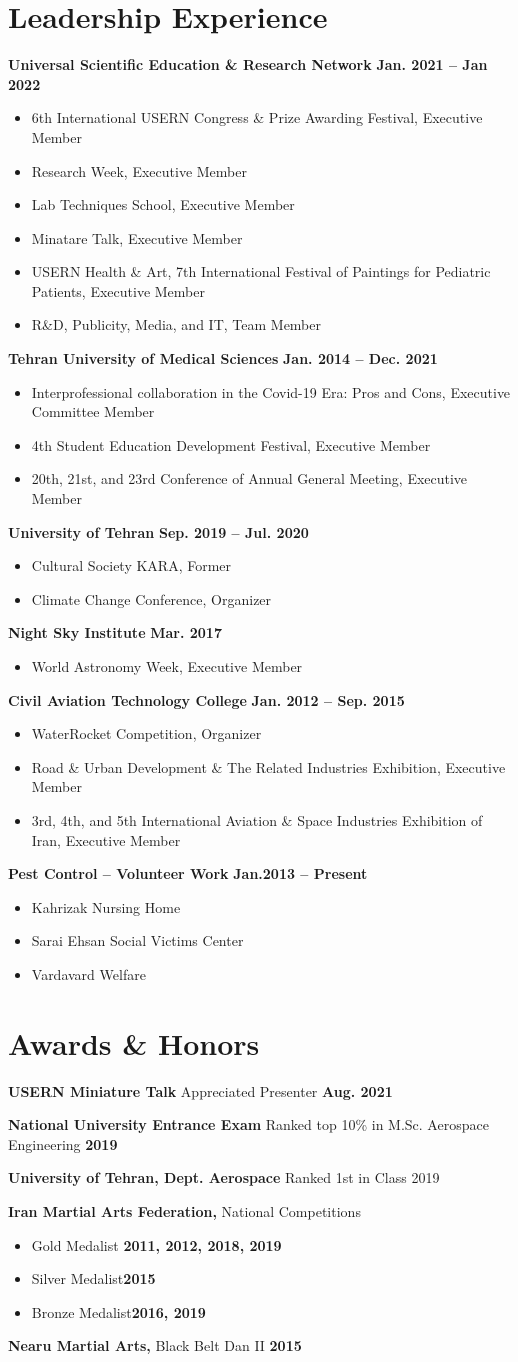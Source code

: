 \documentclass[a4,25pt]{article}
\newenvironment{Experience}[1]{
    \section*{#1} \vspace{-.2cm}
    \hspace{.5cm}
    \begin{minipage}{0.95\linewidth}
    }{ \end{minipage}}
\newcommand{\experience}[3]{ 
  \vspace{0.1cm}\textbf{#1}{ #2} \hfill \textbf{#3} \par
}
\newcommand{\expdetails}[1]{
    \begin{itemize} 
    \item #1 \vspace{1pt}
    \end{itemize} 
}
\begin{document}
\begin{Experience}{Leadership Experience}
    \experience{Universal Scientific Education \& Research Network}{}{Jan. 2021 – Jan 2022}
    \expdetails{6th International USERN Congress \& Prize Awarding Festival, Executive Member} 
    \expdetails{Research Week, Executive Member}
    \expdetails{Lab Techniques School, Executive Member}
    \expdetails{Minatare Talk, Executive Member}
    \expdetails{USERN Health \& Art, 7th International Festival of Paintings for Pediatric Patients, Executive Member}
    \expdetails{R\&D, Publicity, Media, and IT, Team Member}
    \experience{Tehran University of Medical Sciences}{}{Jan. 2014 – Dec. 2021}
    \expdetails{Interprofessional collaboration in the Covid-19 Era: Pros and Cons, Executive Committee Member}
    \expdetails{4th Student Education Development Festival, Executive Member}
    \expdetails{20th, 21st, and 23rd Conference of Annual General Meeting, Executive Member}
    \experience{University of Tehran}{}{Sep. 2019 – Jul. 2020}
    \expdetails{Cultural Society KARA, Former}
    \expdetails{Climate Change Conference, Organizer}
    \experience{Night Sky Institute}{}{Mar. 2017}
    \expdetails{World Astronomy Week, Executive Member}
    \experience{Civil Aviation Technology College}{}{Jan. 2012 – Sep. 2015}
    \expdetails{WaterRocket Competition, Organizer}
    \expdetails{Road \& Urban Development \& The Related Industries Exhibition, Executive Member}
    \expdetails{3rd, 4th, and 5th International Aviation \& Space Industries Exhibition of Iran, Executive Member}
    \experience{Pest Control – Volunteer Work}{}{Jan.2013 – Present}
    \expdetails{Kahrizak Nursing Home}
    \expdetails{Sarai Ehsan Social Victims Center}
    \expdetails{Vardavard Welfare}
\end{Experience}



\begin{Experience}{Awards \& Honors}
    \experience{USERN Miniature Talk}{Appreciated Presenter}{Aug. 2021}
    \experience{National University Entrance Exam}{Ranked top 10\% in M.Sc. Aerospace Engineering}{2019}
    \experience{University of Tehran, Dept. Aerospace}{Ranked 1st in Class 2019}{}
    \experience{Iran Martial Arts Federation,}{ National Competitions}{}
    \expdetails{Gold Medalist \hfill \textbf{2011, 2012, 2018, 2019}}
    \expdetails{Silver Medalist\hfill\textbf{2015}}
    \expdetails{Bronze Medalist\hfill \textbf{2016, 2019}}
    \experience{Nearu Martial Arts,}{ Black Belt Dan II}{2015}
\end{Experience}
\end{document}
